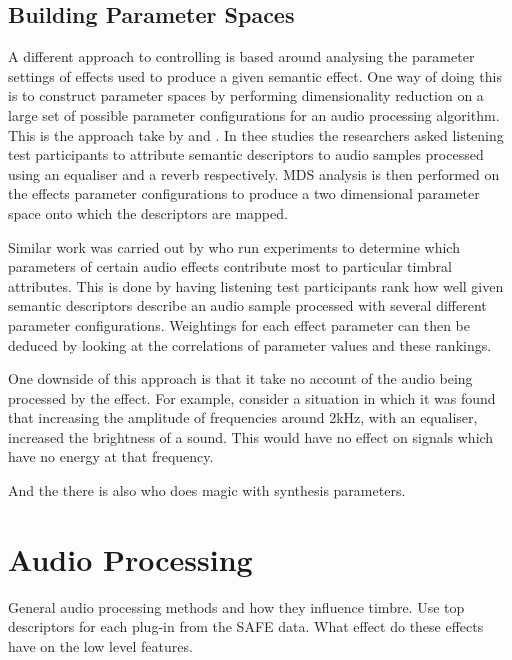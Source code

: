 	\subsection{Building Parameter Spaces}
	\label{sec:Timbre-Control-ParameterSpaces}
		A different approach to controlling is based around analysing the parameter settings of effects used to
		produce a given semantic effect. One way of doing this is to construct parameter spaces by performing
		dimensionality reduction on a large set of possible parameter configurations for an audio processing
		algorithm. This is the approach take by \citet{cartwright2013socialeq} and
		\citet{seetharaman2014crowdsourcing}. In thee studies the researchers asked listening test participants to
		attribute semantic descriptors to audio samples processed using an equaliser and a reverb respectively. MDS
		analysis is then performed on the effects parameter configurations to produce a two dimensional parameter
		space onto which the descriptors are mapped.

		Similar work was carried out by \citet{sabin2011weighting} who run experiments to determine which parameters
		of certain audio effects contribute most to particular timbral attributes. This is done by having listening
		test participants rank how well given semantic descriptors describe an audio sample processed with several
		different parameter configurations. Weightings for each effect parameter can then be deduced by looking at
		the correlations of parameter values and these rankings.

		One downside of this approach is that it take no account of the audio being processed by the effect. For
		example, consider a situation in which it was found that increasing the amplitude of frequencies around
		2kHz, with an equaliser, increased the brightness of a sound. This would have no effect on signals which
		have no energy at that frequency.

		\note
		{
			And the there is also \citet{huang2014active} who does magic with synthesis parameters.
		}

\section{Audio Processing}
\note
{
	General audio processing methods and how they influence timbre. Use top descriptors for each plug-in from the SAFE
	data. What effect do these effects have on the low level features.
}
